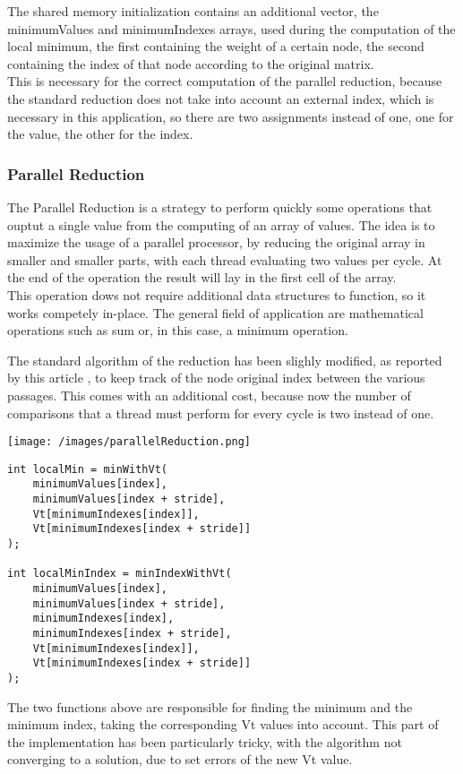 \documentclass[
	a4paper, %
	12pt, %
]{class}
\begin{document}
The shared memory initialization contains an additional vector, the minimumValues and minimumIndexes arrays, used during the computation of the local minimum,
the first containing the weight of a certain node, the second containing the index of that node according to the original matrix.\\

This is necessary for the correct computation of the parallel reduction, because the standard reduction does not take into account an external index, which is necessary
in this application, so there are two assignments instead of one, one for the value, the other for the index.

\subsubsection{Parallel Reduction}
The Parallel Reduction is a strategy to perform quickly some operations that ouptut a single value from the computing of an array of values.
The idea is to maximize the usage of a parallel processor, by reducing the original array in smaller and smaller parts, with each thread evaluating two values per cycle.
At the end of the operation the result will lay in the first cell of the array.\\

This operation dows not require additional data structures to function, so it works competely in-place. The general field of application are mathematical operations such as sum or, in this case, a
minimum operation.

The standard algorithm of the reduction has been slighly modified, as reported by this article \cite{wiki}, to keep track of the node original index between the various passages. This comes with an additional
cost, because now the number of comparisons that a thread must perform for every cycle is two instead of one.


\begin{center}
    \texttt{[image: /images/parallelReduction.png]}
\end{center}
\begin{verbatim}
int localMin = minWithVt(
    minimumValues[index],
    minimumValues[index + stride],
    Vt[minimumIndexes[index]],
    Vt[minimumIndexes[index + stride]]
);

int localMinIndex = minIndexWithVt(
    minimumValues[index],
    minimumValues[index + stride],
    minimumIndexes[index],
    minimumIndexes[index + stride],
    Vt[minimumIndexes[index]],
    Vt[minimumIndexes[index + stride]]
);
\end{verbatim}
The two functions above are responsible for finding the minimum and the minimum index, taking the corresponding Vt values into account.
This part of the implementation has been particularly tricky, with the algorithm not converging to a solution, due to set errors of the new Vt value.\\
\end{document}
